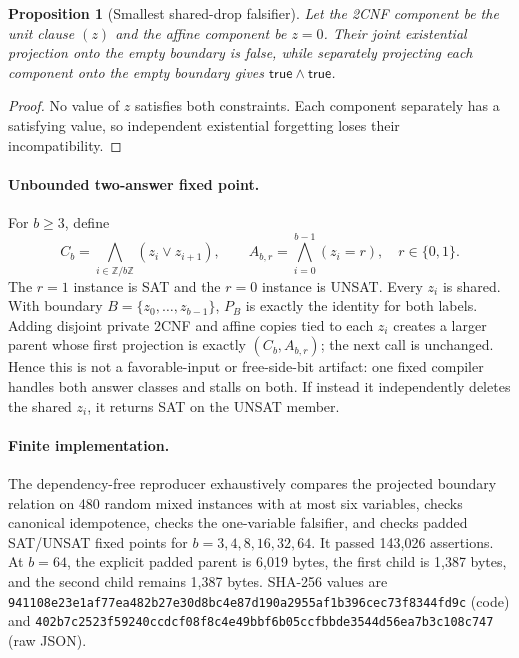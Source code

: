 \documentclass[11pt]{article}
\newtheorem{proposition}[theorem]{Proposition}
\begin{document}
\begin{proposition}[Smallest shared-drop falsifier]
Let the 2CNF component be the unit clause $(z)$ and the affine component be $z=0$.  Their joint existential projection onto the empty boundary is false, while separately projecting each component onto the empty boundary gives $\mathsf{true}\wedge\mathsf{true}$.
\end{proposition}
\begin{proof}
No value of $z$ satisfies both constraints.  Each component separately has a satisfying value, so independent existential forgetting loses their incompatibility.
\end{proof}

\paragraph{Unbounded two-answer fixed point.}
For $b\ge3$, define
\[
 C_b=\bigwedge_{i\in\mathbb Z/b\mathbb Z}(z_i\vee z_{i+1}),
 \qquad A_{b,r}=\bigwedge_{i=0}^{b-1}(z_i=r),\quad r\in\{0,1\}.
\]
The $r=1$ instance is SAT and the $r=0$ instance is UNSAT.  Every $z_i$ is shared.  With boundary $B=\{z_0,\ldots,z_{b-1}\}$, $P_B$ is exactly the identity for both labels.  Adding disjoint private 2CNF and affine copies tied to each $z_i$ creates a larger parent whose first projection is exactly $(C_b,A_{b,r})$; the next call is unchanged.  Hence this is not a favorable-input or free-side-bit artifact: one fixed compiler handles both answer classes and stalls on both.  If instead it independently deletes the shared $z_i$, it returns SAT on the UNSAT member.

\paragraph{Finite implementation.}
The dependency-free reproducer exhaustively compares the projected boundary relation on 480 random mixed instances with at most six variables, checks canonical idempotence, checks the one-variable falsifier, and checks padded SAT/UNSAT fixed points for $b=3,4,8,16,32,64$.  It passed 143,026 assertions.  At $b=64$, the explicit padded parent is 6,019 bytes, the first child is 1,387 bytes, and the second child remains 1,387 bytes.  SHA-256 values are
\texttt{941108e23e1af77ea482b27e30d8bc4e87d190a2955af1b396cec73f8344fd9c} (code) and
\texttt{402b7c2523f59240ccdcf08f8c4e49bbf6b05ccfbbde3544d56ea7b3c108c747} (raw JSON).
\end{document}
